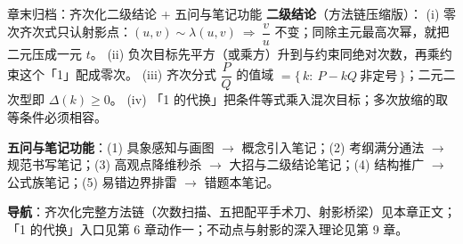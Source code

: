 \begin{notezone}{章末归档：齐次化二级结论 + 五问与笔记功能}
\textbf{二级结论}（方法链压缩版）：
(i) 零次齐次式只认射影点：$(u,v)\sim\lambda(u,v)\ \Rightarrow\ \dfrac vu$ 不变；同除主元最高次幂，就把二元压成一元 $t$。
(ii) 负次目标先平方（或乘方）升到与约束同绝对次数，再乘约束这个「1」配成零次。
(iii) 齐次分式 $\dfrac PQ$ 的值域 $=\{\,k:\ P-kQ\ \text{非定号}\,\}$；二元二次型即 $\Delta(k)\ge0$。
(iv) 「1 的代换」把条件等式乘入混次目标；多次放缩的取等条件必须相容。

\textbf{五问与笔记功能}：(1) 具象感知与画图 $\to$ 概念引入笔记；(2) 考纲满分通法 $\to$ 规范书写笔记；(3) 高观点降维秒杀 $\to$ 大招与二级结论笔记；(4) 结构推广 $\to$ 公式族笔记；(5) 易错边界排雷 $\to$ 错题本笔记。

\textbf{导航}：齐次化完整方法链（次数扫描、五把配平手术刀、射影桥梁）见本章正文；「1 的代换」入口见第 6 章动作一；不动点与射影的深入理论见第 9 章。
\end{notezone}
